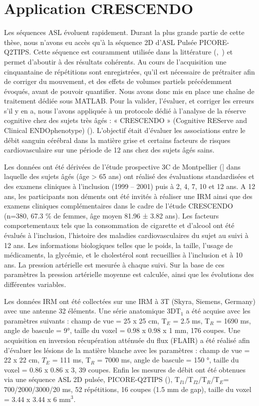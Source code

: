 \section{Application CRESCENDO}
Les séquences ASL évoluent rapidement. Durant la plus grande partie de cette thèse, nous
n’avons eu accès qu’à la séquence 2D d’ASL Pulsée PICORE-Q2TIPS. Cette séquence est couramment
utilisée dans la littérature (\cite{Bastos-Leite2008},~\cite{Haller2013}) et permet d’aboutir à des résultats cohérents. Au cours de
l’acquisition une cinquantaine de répétitions sont enregistrées, qu’il est nécessaire de prétraiter afin
de corriger du mouvement, et des effets de volumes partiels précédemment évoqués, avant de
pouvoir quantifier. Nous avons donc mis en place une chaîne de traitement dédiée sous MATLAB. Pour
la valider, l’évaluer, et corriger les erreurs s’il y en a, nous l’avons appliquée à un protocole dédié à
l’analyse de la réserve cognitive chez des sujets très âgés : « CRESCENDO » (Cognitive REServe and
Clinical ENDOphenotype) (\cite{Deverdun2015}). L’objectif était d’évaluer les associations entre le débit sanguin
cérébral dans la matière grise et certains facteurs de risques cardiovasculaire sur une période de 12
ans chez des sujets âgés sains.

Les données ont été dérivées de l’étude prospective 3C de Montpellier (\cite{Alperovitch2002}] dans laquelle des
sujets âgés (âge > 65 ans) ont réalisé des évaluations standardisées et des examens cliniques à
l’inclusion (1999 – 2001) puis à 2, 4, 7, 10 et 12 ans. A 12 ans, les participants non déments ont été
invités à réaliser une IRM ainsi que des examens cliniques complémentaires dans le cadre de l’étude
CRESCENDO (n=380, 67.3 \% de femmes, âge moyen 81.96 ± 3.82 ans). Les facteurs comportementaux
tels que la consommation de cigarette et d’alcool ont été évalués à l’inclusion, l’histoire des maladies
cardiovasculaires du sujet au suivi à 12 ans. Les informations biologiques telles que le poids, la taille,
l’usage de médicaments, la glycémie, et le cholestérol sont recueillies à l’inclusion et à 10 ans. La
pression artérielle est mesurée à chaque suivi. Sur la base de ces paramètres la pression artérielle
moyenne est calculée, ainsi que les évolutions des différentes variables.

Les données IRM ont été collectées sur une IRM à 3T (Skyra, Siemens, Germany) avec une
antenne 32 éléments. Une série anatomique 3DT$_1$ a été acquise avec les paramètres suivants : champ
de vue = 25 x 25 cm, T$_E$ = 2.5 ms, T$_R$ = 1690 ms, angle de bascule = 9°, taille du voxel = 0.98 x 0.98 x 1
mm, 176 coupes. Une acquisition en inversion récupération atténuée du flux (FLAIR) a été réalisé afin
d’évaluer les lésions de la matière blanche avec les paramètres : champ de vue = 22 x 22 cm, $T_E$ = 111
ms, T$_R$ = 7000 ms, angle de bascule = 150 °, taille du voxel = 0.86 x 0.86 x 3, 39 coupes. Enfin les mesures
de débit ont été obtenues via une séquence ASL 2D pulsée, PICORE-Q2TIPS (\cite{Luh1999}), T$_{I1}$/T$_{I2}$/T$_{R}$/T$_{E}$=
700/2000/3000/20 ms, 52 répétitions, 16 coupes (1.5 mm de gap), taille du voxel = 3.44 x 3.44 x 6 mm$^3$.

